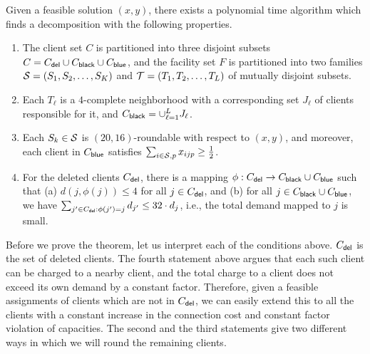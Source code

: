 \begin{theorem}\label{thm:decomp}
	Given a feasible solution $(x,y)$, there exists a polynomial time algorithm which finds a decomposition with the following properties.
	\begin{enumerate}%
		\item The client set $C$ is partitioned into three disjoint subsets $C = C_{\mathsf{del}} \cup C_{\mathsf{black}} \cup C_{\mathsf{blue}}$, and the facility set $F$ is partitioned into two families ${\cal S} = (S_1, S_2, \ldots, S_K)$ and ${\cal T} = (T_1, T_2, \ldots, T_L)$ of mutually disjoint subsets.

\item Each $T_\ell$ is a $4$-complete neighborhood with a corresponding set $J_\ell$ of clients responsible for it, and $C_{\mathsf{black}} = \cup_{\ell = 1}^L J_\ell$.	

		\item Each $S_k \in {\cal S}$ is $(20,16)$-roundable with respect to $(x,y)$, and moreover, each client in $C_{\mathsf{blue}}$ satisfies $\sum_{i \in {\cal S}, p} x_{ijp} \geq \frac12$.

\item For the deleted clients $C_{\mathsf{del}}$, there is a mapping $\phi:C_{\mathsf{del}} \to C_{\mathsf{black}} \cup C_{\mathsf{blue}}$ such that
(a) $d(j,\phi(j)) \leq 4$ for all $j\in C_{\mathsf{del}}$, and
(b)	for all $j\in C_{\mathsf{black}} \cup C_{\mathsf{blue}}$, we have $\sum_{j' \in C_{\mathsf{del}}: \phi(j') = j} d_{j'} \leq 32\cdot d_j$, i.e., the total demand mapped to $j$ is small.

\end{enumerate}
\end{theorem}


Before we prove the theorem, let us interpret each of the conditions above. $C_{\mathsf{del}}$ is the set of deleted clients. The fourth statement above argues that each such  client can be charged to a nearby client, and  the total charge to a client does not exceed its own demand by a constant factor. Therefore, given a feasible assignments of clients which are not in $C_{\mathsf{del}}$, we can easily extend this to all the clients with a constant increase in the connection cost and constant factor violation of capacities. The second and the third statements give two different ways in which we will round the remaining clients.


